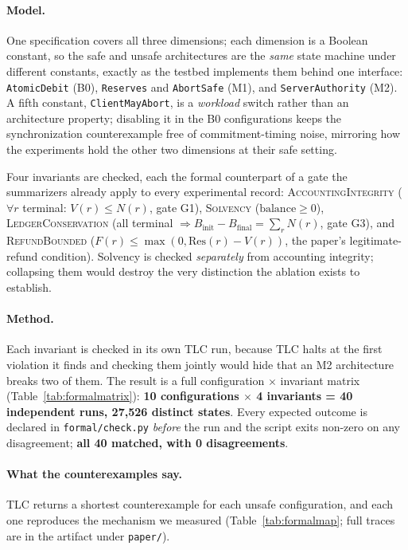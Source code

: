 \documentclass[11pt]{article}
\begin{document}
\paragraph{Model.} One specification covers all three dimensions; each dimension is a
Boolean constant, so the safe and unsafe architectures are the \emph{same} state machine
under different constants, exactly as the testbed implements them behind one interface:
\texttt{AtomicDebit} (B0), \texttt{Reserves} and \texttt{AbortSafe} (M1), and
\texttt{ServerAuthority} (M2). A fifth constant, \texttt{ClientMayAbort}, is a
\emph{workload} switch rather than an architecture property; disabling it in the B0
configurations keeps the synchronization counterexample free of commitment-timing noise,
mirroring how the experiments hold the other two dimensions at their safe setting.

Four invariants are checked, each the formal counterpart of a gate the summarizers already
apply to every experimental record: \textsc{AccountingIntegrity}
($\forall r$ terminal: $V(r)\le N(r)$, gate G1), \textsc{Solvency} ($\mathrm{balance}\ge0$),
\textsc{LedgerConservation} (all terminal $\Rightarrow B_{\text{init}}-B_{\text{final}}=\sum_r N(r)$,
gate G3), and \textsc{RefundBounded} ($F(r)\le\max(0,\mathrm{Res}(r)-V(r))$, the paper's
legitimate-refund condition). Solvency is checked \emph{separately} from accounting
integrity; collapsing them would destroy the very distinction the ablation exists to
establish.

\paragraph{Method.} Each invariant is checked in its own TLC run, because TLC halts at the
first violation it finds and checking them jointly would hide that an M2 architecture
breaks two of them. The result is a full configuration $\times$ invariant matrix
(Table~\ref{tab:formalmatrix}): \textbf{10 configurations $\times$ 4 invariants = 40
independent runs, 27{,}526 distinct states}. Every expected outcome is declared in
\texttt{formal/check.py} \emph{before} the run and the script exits non-zero on any
disagreement; \textbf{all 40 matched, with 0 disagreements}.



\paragraph{What the counterexamples say.} TLC returns a shortest counterexample for each
unsafe configuration, and each one reproduces the mechanism we measured
(Table~\ref{tab:formalmap}; full traces are in the artifact under
\texttt{paper/}).
\end{document}
